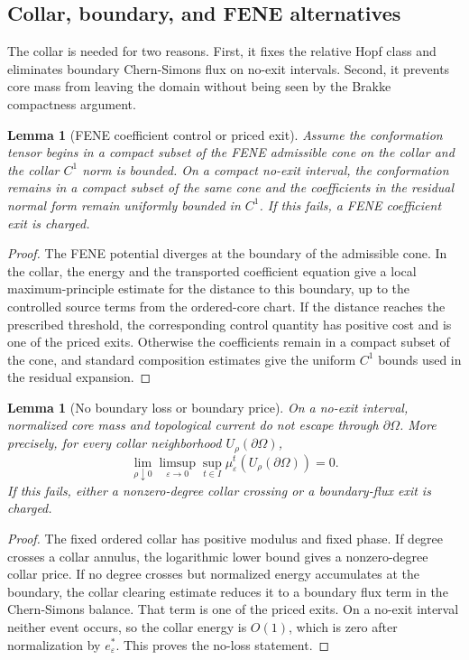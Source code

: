 \documentclass[11pt]{article}
\newtheorem{lemma}[theorem]{Lemma}
\theoremstyle{definition}
\newcommand{\eps}{\varepsilon}
\newcommand{\estar}{e_\varepsilon^\ast}
\begin{document}
\subsection{Collar, boundary, and FENE alternatives}

The collar is needed for two reasons.  First, it fixes the relative Hopf class
and eliminates boundary Chern-Simons flux on no-exit intervals.  Second, it
prevents core mass from leaving the domain without being seen by the Brakke
compactness argument.

\begin{lemma}[FENE coefficient control or priced exit]
\label{lem:app-fene-control}
Assume the conformation tensor begins in a compact subset of the FENE
admissible cone on the collar and the collar \(C^1\) norm is bounded.  On a
compact no-exit interval, the conformation remains in a compact subset of the
same cone and the coefficients in the residual normal form remain uniformly
bounded in \(C^1\).  If this fails, a FENE coefficient exit is charged.
\end{lemma}

\begin{proof}
The FENE potential diverges at the boundary of the admissible cone.  In the
collar, the energy and the transported coefficient equation give a local
maximum-principle estimate for the distance to this boundary, up to the
controlled source terms from the ordered-core chart.  If the distance reaches
the prescribed threshold, the corresponding control quantity has positive cost and is
one of the priced exits.  Otherwise the coefficients remain in a compact subset
of the cone, and standard composition estimates give the uniform \(C^1\) bounds
used in the residual expansion.
\end{proof}

\begin{lemma}[No boundary loss or boundary price]
\label{lem:app-no-boundary-loss}
On a no-exit interval, normalized core mass and topological current do not
escape through \(\partial\Omega\).  More precisely, for every collar
neighborhood \(U_\rho(\partial\Omega)\),
\[
        \lim_{\rho\downarrow0}
        \limsup_{\eps\to0}
        \sup_{t\in I}
        \mu_\eps^t(U_\rho(\partial\Omega))
        =
        0.
\]
If this fails, either a nonzero-degree collar crossing or a boundary-flux exit
is charged.
\end{lemma}

\begin{proof}
The fixed ordered collar has positive modulus and fixed phase.  If degree
crosses a collar annulus, the logarithmic lower bound gives a nonzero-degree
collar price.  If no degree crosses but normalized energy accumulates at the
boundary, the collar clearing estimate reduces it to a boundary flux term in
the Chern-Simons balance.  That term is one of the priced exits.  On a no-exit
interval neither event occurs, so the collar energy is \(O(1)\), which is
zero after normalization by \(\estar\).  This proves the no-loss statement.
\end{proof}
\end{document}
